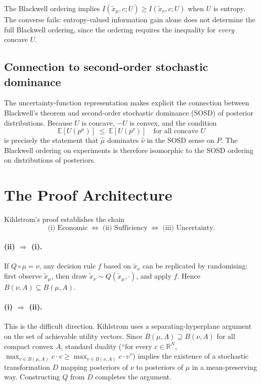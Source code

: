 \documentclass[12pt]{article}
\begin{document}
The Blackwell ordering implies $I(\tilde{x}_\mu, c; U) \geq I(\tilde{x}_\nu, c; U)$
when $U$ is entropy.  The converse fails: entropy-valued information gain alone
does not determine the full Blackwell ordering, since the ordering requires the
inequality for \emph{every} concave $U$.

\subsection{Connection to second-order stochastic dominance}

The uncertainty-function representation makes explicit the connection between
Blackwell's theorem and second-order stochastic dominance (SOSD) of posterior
distributions.  Because $U$ is concave, $-U$ is convex, and the condition
\[
\mathbb{E}[U(p^\mu)] \;\leq\; \mathbb{E}[U(p^\nu)]
\quad \text{for all concave } U
\]
is precisely the statement that $\hat\mu$ dominates $\hat\nu$ in the SOSD
sense on $P$.  The Blackwell ordering on experiments is therefore isomorphic
to the SOSD ordering on distributions of posteriors.

\section{The Proof Architecture}

Kihlstrom's proof establishes the chain
\[
\text{(i) Economic} \;\Longleftrightarrow\; \text{(ii) Sufficiency}
\;\Longleftrightarrow\; \text{(iii) Uncertainty}.
\]

\paragraph{(ii) $\Rightarrow$ (i).}
If $Q \circ \mu = \nu$, any decision rule $f$ based on $\tilde{x}_\nu$ can
be replicated by randomising: first observe $\tilde{x}_\mu$, then draw
$\tilde{x}_\nu \sim Q(\tilde{x}_\mu, \cdot)$, and apply $f$.  Hence
$B(\nu, A) \subseteq B(\mu, A)$.

\paragraph{(i) $\Rightarrow$ (ii).}
This is the difficult direction.  Kihlstrom uses a separating-hyperplane
argument on the set of achievable utility vectors.  Since
$B(\mu, A) \supseteq B(\nu, A)$ for all compact convex $A$, standard duality
(``for every $c \in \mathbb{R}^N$, $\max_{v \in B(\mu,A)} c \cdot v \geq
\max_{v \in B(\nu,A)} c \cdot v$'') implies the existence of a stochastic
transformation $D$ mapping posteriors of $\nu$ to posteriors of $\mu$ in a
mean-preserving way.  Constructing $Q$ from $D$ completes the argument.
\end{document}

